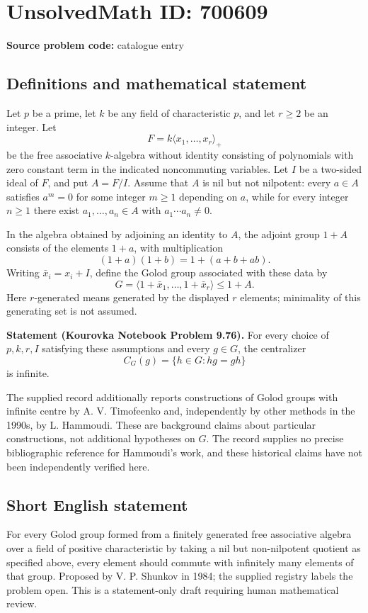 \documentclass[11pt]{article}
\begin{document}
\section*{UnsolvedMath ID: 700609}
\textbf{Source problem code:} catalogue entry
\subsection{Definitions and mathematical statement}
Let \(p\) be a prime, let \(k\) be any field of characteristic \(p\), and let \(r\geq 2\) be an integer. Let
\[
F=k\langle x_1,\ldots,x_r\rangle_{+}
\]
be the free associative \(k\)-algebra without identity consisting of polynomials with zero constant term in the indicated noncommuting variables. Let \(I\) be a two-sided ideal of \(F\), and put \(A=F/I\). Assume that \(A\) is nil but not nilpotent: every \(a\in A\) satisfies \(a^m=0\) for some integer \(m\geq 1\) depending on \(a\), while for every integer \(n\geq 1\) there exist \(a_1,\ldots,a_n\in A\) with \(a_1\cdots a_n\neq 0\).

In the algebra obtained by adjoining an identity to \(A\), the adjoint group \(1+A\) consists of the elements \(1+a\), with multiplication
\[
(1+a)(1+b)=1+(a+b+ab).
\]
Writing \(\bar x_i=x_i+I\), define the Golod group associated with these data by
\[
G=\langle 1+\bar x_1,\ldots,1+\bar x_r\rangle\leq 1+A.
\]
Here \(r\)-generated means generated by the displayed \(r\) elements; minimality of this generating set is not assumed.

\textbf{Statement (Kourovka Notebook Problem 9.76).} For every choice of \(p,k,r,I\) satisfying these assumptions and every \(g\in G\), the centralizer
\[
C_G(g)=\{h\in G:hg=gh\}
\]
is infinite.

The supplied record additionally reports constructions of Golod groups with infinite centre by A. V. Timofeenko and, independently by other methods in the 1990s, by L. Hammoudi. These are background claims about particular constructions, not additional hypotheses on \(G\). The record supplies no precise bibliographic reference for Hammoudi's work, and these historical claims have not been independently verified here.
\subsection{Short English statement}
For every Golod group formed from a finitely generated free associative algebra over a field of positive characteristic by taking a nil but non-nilpotent quotient as specified above, every element should commute with infinitely many elements of that group. Proposed by V. P. Shunkov in 1984; the supplied registry labels the problem open. This is a statement-only draft requiring human mathematical review.
\end{document}
